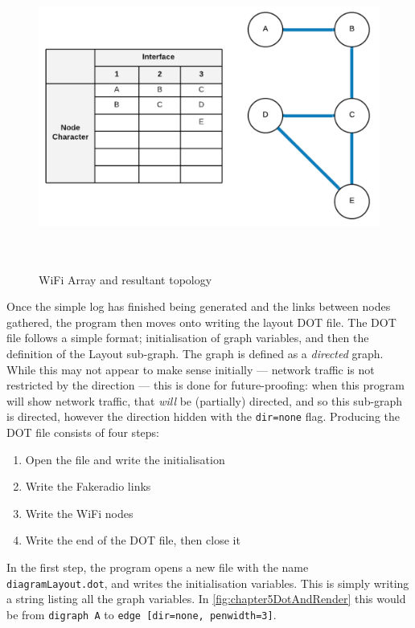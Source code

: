 \begin{figure}
    \begin{centering}
        \includegraphics[width=15cm,height=10cm,keepaspectratio]{Figures/Chapter5-WifiArrayResult.png}
        \caption{WiFi Array and resultant topology}
        \label{fig:chapter5ResultWifiTopology}
    \end{centering}
\end{figure}

Once the simple log has finished being generated and the links between nodes gathered, the program then moves onto writing the layout DOT file.
The DOT file follows a simple format; initialisation of graph variables, and then the definition of the Layout sub-graph.
The graph is defined as a \emph{directed} graph.
While this may not appear to make sense initially — network traffic is not restricted by the direction — this is done for future-proofing: when this program will show network traffic, that \emph{will} be (partially) directed, and so this sub-graph is directed, however the direction hidden with the \verb|dir=none| flag.
Producing the DOT file consists of four steps:
\begin{enumerate}
    \item Open the file and write the initialisation
    \item Write the Fakeradio links
    \item Write the WiFi nodes
    \item Write the end of the DOT file, then close it
\end{enumerate}

In the first step, the program opens a new file with the name \verb|diagramLayout.dot|, and writes the initialisation variables.
This is simply writing a string listing all the graph variables. 
In \figurename{ \ref{fig:chapter5DotAndRender}} this would be from \verb|digraph A| to \verb|edge [dir=none, penwidth=3]|.

